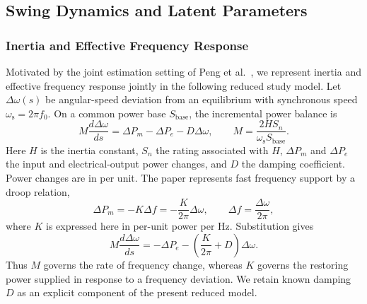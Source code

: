 \documentclass[journal]{IEEEtran}
\begin{document}
\subsection{Swing Dynamics and Latent Parameters}
\label{sec:dynamics}
\subsubsection{Inertia and Effective Frequency Response}
Motivated by the joint estimation setting of Peng et al.~\cite{peng2024probing},
we represent inertia and effective frequency response jointly in the following
reduced study model. Let $\Delta\omega(s)$ be angular-speed deviation
from an equilibrium with synchronous speed $\omega_{\mathrm s}=2\pi f_0$.
On a common power base $S_{\mathrm{base}}$, the incremental power balance is
\begin{equation}
M\frac{d\Delta\omega}{ds}
=\Delta P_m-\Delta P_e-D\Delta\omega,
\qquad M=\frac{2HS_n}{\omega_{\mathrm s}S_{\mathrm{base}}}.
\label{eq:inertia-balance}
\end{equation}
Here $H$ is the inertia constant, $S_n$ the rating associated with $H$,
$\Delta P_m$ and $\Delta P_e$ the input and electrical-output power changes,
and $D$ the damping coefficient. Power changes are in per unit.
The paper represents fast frequency support by a droop relation,
\begin{equation}
\Delta P_m=-K\Delta f=-\frac{K}{2\pi}\Delta\omega,
\qquad \Delta f=\frac{\Delta\omega}{2\pi},
\label{eq:frequency-support}
\end{equation}
where $K$ is expressed here in per-unit power per Hz. Substitution gives
\begin{equation}
M\frac{d\Delta\omega}{ds}
=-\Delta P_e-\left(\frac{K}{2\pi}+D\right)\Delta\omega.
\label{eq:aggregate_model}
\end{equation}
Thus $M$ governs the rate of frequency change, whereas $K$ governs the
restoring power supplied in response to a frequency deviation. We retain
known damping $D$ as an explicit component of the present reduced model.
\end{document}
